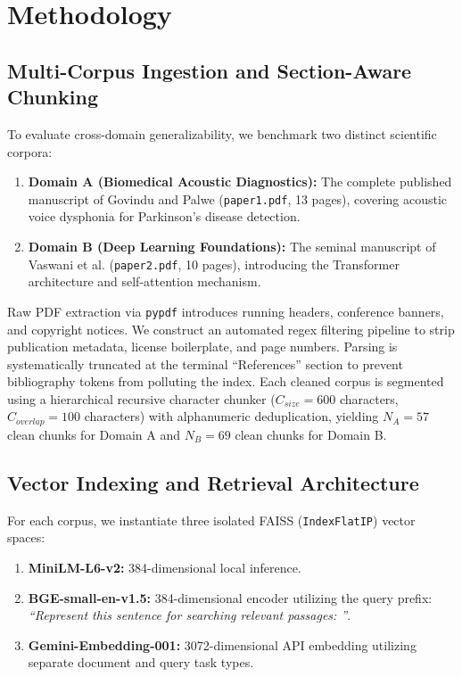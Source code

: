\documentclass[conference]{IEEEtran}
\begin{document}
\section{Methodology}

\subsection{Multi-Corpus Ingestion and Section-Aware Chunking}
To evaluate cross-domain generalizability, we benchmark two distinct scientific corpora:
\begin{enumerate}
    \item \textbf{Domain A (Biomedical Acoustic Diagnostics):} The complete published manuscript of Govindu and Palwe \cite{govindu2023early} (\texttt{paper1.pdf}, 13 pages), covering acoustic voice dysphonia for Parkinson's disease detection.
    \item \textbf{Domain B (Deep Learning Foundations):} The seminal manuscript of Vaswani et al. \cite{vaswani2017attention} (\texttt{paper2.pdf}, 10 pages), introducing the Transformer architecture and self-attention mechanism.
\end{enumerate}

Raw PDF extraction via \texttt{pypdf} introduces running headers, conference banners, and copyright notices. We construct an automated regex filtering pipeline to strip publication metadata, license boilerplate, and page numbers. Parsing is systematically truncated at the terminal ``References'' section to prevent bibliography tokens from polluting the index. Each cleaned corpus is segmented using a hierarchical recursive character chunker ($C_{size} = 600$ characters, $C_{overlap} = 100$ characters) with alphanumeric deduplication, yielding $N_A = 57$ clean chunks for Domain A and $N_B = 69$ clean chunks for Domain B.

\subsection{Vector Indexing and Retrieval Architecture}
For each corpus, we instantiate three isolated FAISS (\texttt{IndexFlatIP}) vector spaces:
\begin{enumerate}
    \item \textbf{MiniLM-L6-v2:} 384-dimensional local inference.
    \item \textbf{BGE-small-en-v1.5:} 384-dimensional encoder utilizing the query prefix: \textit{``Represent this sentence for searching relevant passages: ''}.
    \item \textbf{Gemini-Embedding-001:} 3072-dimensional API embedding utilizing separate document and query task types.
\end{enumerate}
\end{document}
